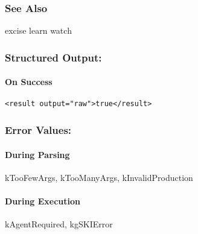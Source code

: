 \subsubsection*{See Also}
 excise learn watch
\subsubsection*{Structured Output:}
\paragraph*{On Success}
\begin{verbatim}
<result output="raw">true</result>
\end{verbatim}
\subsubsection*{Error Values:}
\paragraph*{During Parsing}
 kTooFewArgs, kTooManyArgs, kInvalidProduction
\paragraph*{During Execution}
 kAgentRequired, kgSKIError
